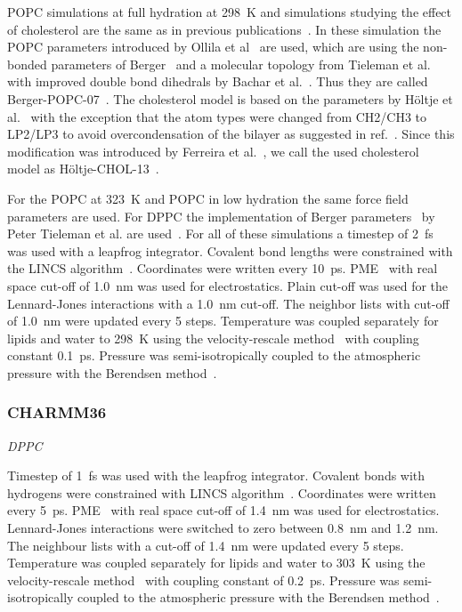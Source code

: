 \documentclass[pre,aps,floatfix,authordate1-4,twocolumn]{revtex4-1}
\begin{document}
POPC simulations at full hydration at 298~K and simulations studying the effect of cholesterol are the same as in previous publications~\cite{ferreira13,ferreira15}.
In these simulation the POPC parameters introduced by Ollila et al~\cite{ollila07a} are used, which are using the non-bonded parameters of Berger~\cite{berger97}
and a molecular topology from Tieleman et al.~\cite{tieleman99} with improved double bond dihedrals by Bachar et al.~\cite{bachar04}. 
Thus they are called Berger-POPC-07~\cite{ollila07a}. The cholesterol model is based on the parameters by H\"oltje et al.~\cite{holtje01} with the
exception that the atom types were changed from CH2/CH3 to LP2/LP3 to avoid overcondensation of the bilayer as suggested in ref.~\cite{tieleman06}.
Since this modification was introduced by Ferreira et al.~\cite{ferreira13}, we call the used cholesterol model as H\"oltje-CHOL-13~\cite{ferreira13}.

For the POPC at 323~K and POPC in low hydration the same force field parameters are used.
For DPPC the implementation of Berger parameters~\cite{berger97} by Peter Tieleman et al. are used~\cite{marrink98}.
For all of these simulations a timestep of 2~fs was used with a leapfrog integrator. Covalent bond lengths were constrained with the LINCS algorithm~\cite{hess97,hess07}. 
Coordinates were written every 10~ps. PME~\cite{darden93,essman95} with real space cut-off of 1.0~nm was used 
for electrostatics. Plain cut-off was used for the Lennard-Jones interactions with a 1.0~nm cut-off.
The neighbor lists with cut-off of 1.0~nm were updated every 5 steps. Temperature was coupled separately
for lipids and water to 298~K using the velocity-rescale method~\cite{bussi07} with coupling constant 0.1~ps.
Pressure was semi-isotropically coupled to the atmospheric pressure with the Berendsen method~\cite{berendsen84}.


\subsubsection{CHARMM36}

{\it DPPC}

Timestep of 1~fs was used with the leapfrog integrator. Covalent bonds with hydrogens were constrained with LINCS algorithm~\cite{hess97,hess07}. 
Coordinates were written every 5~ps. PME~\cite{darden93,essman95} with real space cut-off of 1.4~nm was used 
for electrostatics. Lennard-Jones interactions were switched to zero between 0.8~nm and 1.2~nm.
The neighbour lists with a cut-off of 1.4~nm were updated every 5 steps. Temperature was coupled separately
for lipids and water to 303~K using the velocity-rescale method~\cite{bussi07} with coupling constant of 0.2~ps.
Pressure was semi-isotropically coupled to the atmospheric pressure with the Berendsen method~\cite{berendsen84}.
\end{document}
